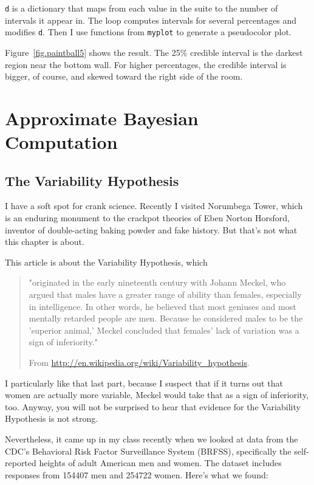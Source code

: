 \documentclass[12pt]{book}
\begin{document}
{\tt d} is a dictionary that maps from each value in the suite
to the number of intervals it appear in.  The loop computes intervals
for several percentages and modifies {\tt d}.  Then I use functions
from {\tt myplot} to generate a pseudocolor plot.

Figure~\ref{fig.paintball5} shows the result.  The 25\% credible
interval is the darkest region near the bottom wall.  For higher
percentages, the credible interval is bigger, of course, and skewed
toward the right side of the room.





\chapter{Approximate Bayesian Computation}

\section{The Variability Hypothesis}

I have a soft spot for crank science.  Recently I visited Norumbega
Tower, which is an enduring monument to the crackpot theories of Eben
Norton Horsford, inventor of double-acting baking powder and fake
history.  But that's not what this chapter is about.

This article is about the Variability Hypothesis, which

\begin{quote}
"originated in the early nineteenth century with Johann Meckel, who
  argued that males have a greater range of ability than females,
  especially in intelligence. In other words, he believed that most
  geniuses and most mentally retarded people are men. Because he
  considered males to be the 'superior animal,' Meckel concluded that
  females' lack of variation was a sign of inferiority."

From \url{http://en.wikipedia.org/wiki/Variability_hypothesis}.
\end{quote}

I particularly like that last part, because I suspect that if it turns
out that women are actually more variable, Meckel would take that as a
sign of inferiority, too.  Anyway, you will not be surprised to hear
that evidence for the Variability Hypothesis is not strong.

Nevertheless, it came up in my class recently when we looked at data
from the CDC's Behavioral Risk Factor Surveillance System (BRFSS),
specifically the self-reported heights of adult American men and women.
The dataset includes responses from 154407 men and 254722 women.
Here's what we found:
\end{document}
